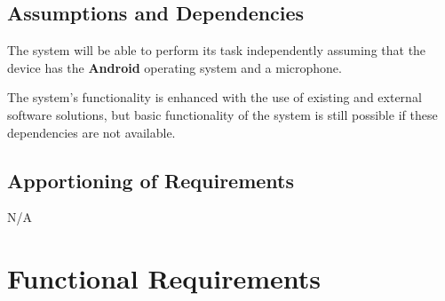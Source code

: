 \documentclass[]{article}
\begin{document}
\subsection{Assumptions and Dependencies}
\label{sub:assumptions_and_dependencies}
The system will be able to perform its task independently assuming that the device has the \textbf{Android} operating system and a microphone. 

The system's functionality is enhanced with the use of existing and external software solutions, but basic functionality of the system is still possible if these dependencies are not available.

\subsection{Apportioning of Requirements}
\label{sub:apportioning_of_requirements}
N/A


\newpage
\section{Functional Requirements}
\label{sec:functional_requirements}
\end{document}
